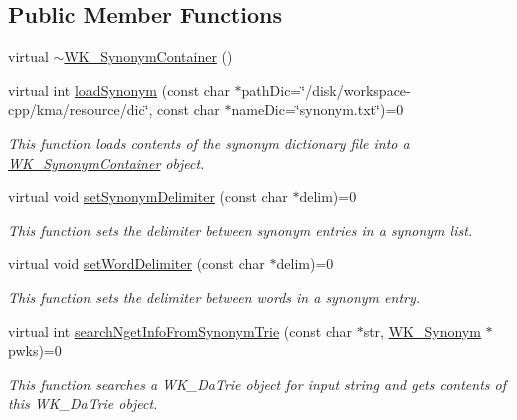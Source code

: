 \subsection*{Public Member Functions}
\begin{CompactItemize}
\item 
virtual \hyperlink{classWK__SynonymContainer_2f305b796f70e83c8589656b3a5bf36a}{$\sim$WK\_\-SynonymContainer} ()
\item 
virtual int \hyperlink{classWK__SynonymContainer_9e7ec0d46d3db686ef5b0d3b9719b96d}{loadSynonym} (const char $\ast$pathDic=\char`\"{}/disk/workspace-cpp/kma/resource/dic\char`\"{}, const char $\ast$nameDic=\char`\"{}synonym.txt\char`\"{})=0
\begin{CompactList}\small\item\em This function loads contents of the synonym dictionary file into a \hyperlink{classWK__SynonymContainer}{WK\_\-SynonymContainer} object. \item\end{CompactList}\item 
virtual void \hyperlink{classWK__SynonymContainer_7a2c0a7a7da0d37c1be8816b1c20c680}{setSynonymDelimiter} (const char $\ast$delim)=0
\begin{CompactList}\small\item\em This function sets the delimiter between synonym entries in a synonym list. \item\end{CompactList}\item 
virtual void \hyperlink{classWK__SynonymContainer_83e7c34dd30aad2478a58f324dcbd594}{setWordDelimiter} (const char $\ast$delim)=0
\begin{CompactList}\small\item\em This function sets the delimiter between words in a synonym entry. \item\end{CompactList}\item 
virtual int \hyperlink{classWK__SynonymContainer_cc44acd798ac38cb00ed4f6caeb6f2fe}{searchNgetInfoFromSynonymTrie} (const char $\ast$str, \hyperlink{classWK__Synonym}{WK\_\-Synonym} $\ast$pwks)=0
\begin{CompactList}\small\item\em This function searches a WK\_\-DaTrie object for input string and gets contents of this WK\_\-DaTrie object. \item\end{CompactList}\end{CompactItemize}
